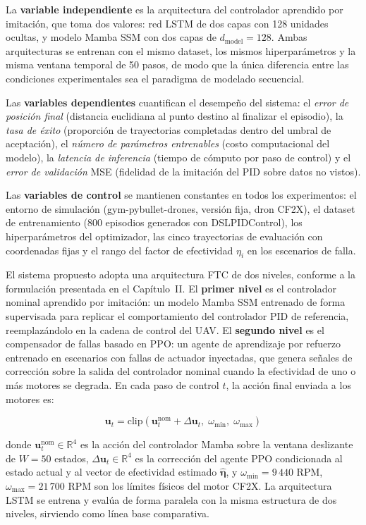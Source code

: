 La \textbf{variable independiente} es la arquitectura del controlador aprendido por imitación, que toma dos valores: red LSTM de dos capas con 128 unidades ocultas, y modelo Mamba SSM con dos capas de $d_{\text{model}}=128$. Ambas arquitecturas se entrenan con el mismo dataset, los mismos hiperparámetros y la misma ventana temporal de 50 pasos, de modo que la única diferencia entre las condiciones experimentales sea el paradigma de modelado secuencial.

Las \textbf{variables dependientes} cuantifican el desempeño del sistema: el \textit{error de posición final} (distancia euclidiana al punto destino al finalizar el episodio), la \textit{tasa de éxito} (proporción de trayectorias completadas dentro del umbral de aceptación), el \textit{número de parámetros entrenables} (costo computacional del modelo), la \textit{latencia de inferencia} (tiempo de cómputo por paso de control) y el \textit{error de validación} MSE (fidelidad de la imitación del PID sobre datos no vistos).

Las \textbf{variables de control} se mantienen constantes en todos los experimentos: el entorno de simulación (gym-pybullet-drones, versión fija, dron CF2X), el dataset de entrenamiento (800 episodios generados con DSLPIDControl), los hiperparámetros del optimizador, las cinco trayectorias de evaluación con coordenadas fijas y el rango del factor de efectividad $\eta_i$ en los escenarios de falla.

El sistema propuesto adopta una arquitectura FTC de dos niveles, conforme a la formulación presentada en el Capítulo~II. El \textbf{primer nivel} es el controlador nominal aprendido por imitación: un modelo Mamba SSM entrenado de forma supervisada para replicar el comportamiento del controlador PID de referencia, reemplazándolo en la cadena de control del UAV. El \textbf{segundo nivel} es el compensador de fallas basado en PPO: un agente de aprendizaje por refuerzo entrenado en escenarios con fallas de actuador inyectadas, que genera señales de corrección sobre la salida del controlador nominal cuando la efectividad de uno o más motores se degrada. En cada paso de control $t$, la acción final enviada a los motores es:

\begin{equation}
\mathbf{u}_t = \text{clip}\!\left(\mathbf{u}_t^{\text{nom}} + \Delta\mathbf{u}_t,\; \omega_{\min},\; \omega_{\max}\right)
\end{equation}

\noindent donde $\mathbf{u}_t^{\text{nom}} \in \mathbb{R}^4$ es la acción del controlador Mamba sobre la ventana deslizante de $W=50$ estados, $\Delta\mathbf{u}_t \in \mathbb{R}^4$ es la corrección del agente PPO condicionada al estado actual y al vector de efectividad estimado $\hat{\boldsymbol{\eta}}$, y $\omega_{\min} = 9\,440$ RPM, $\omega_{\max} = 21\,700$ RPM son los límites físicos del motor CF2X. La arquitectura LSTM se entrena y evalúa de forma paralela con la misma estructura de dos niveles, sirviendo como línea base comparativa.

